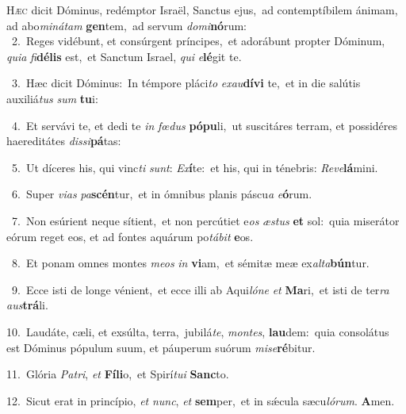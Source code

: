 \lettrine{\initial\textcolor{\initialcolor}{H}}{æc} dicit Dóminus, redémptor Israël, Sanctus ejus,~\dagger ad contemptíbilem ánimam, ad abo\-\textit{mi}\-\textit{ná}\textit{tam} \textbf{gen}\-tem,~\star ad servum \textit{do}\-\textit{mi}\textbf{nó}rum:\\
{\numbfont\textcolor{\numbcolor}{~2.}}~Reges vidébunt, et consúrgent príncipes,~\dagger et adorábunt propter Dóminum, \textit{qui}\-\textit{a} \textit{fi}\-\textbf{dé}\textbf{lis} est,~\star et Sanctum Israel, \textit{qui} \textit{e}\-\textbf{lé}git te.\par
{\numbfont\textcolor{\numbcolor}{~3.}}~Hæc dicit Dóminus:~\dagger In témpore pláci\textit{to} \textit{ex}\-\textit{au}\textbf{dí}\textbf{vi} te,~\star et in die salútis auxiliá\textit{tus} \textit{sum} \textbf{tu}\-i:\par
{\numbfont\textcolor{\numbcolor}{~4.}}~Et servávi te, et dedi te \textit{in} \textit{fœ}\-\textit{dus} \textbf{pó}\-\textbf{pu}li,~\star ut suscitáres terram, et possidéres haereditátes \textit{dis}\-\textit{si}\textbf{pá}tas:\par
{\numbfont\textcolor{\numbcolor}{~5.}}~Ut díceres his, qui vinc\textit{ti} \textit{sunt}\-: \textit{Ex}\-\textbf{í}te:~\star et his, qui in ténebris: \textit{Re}\-\textit{ve}\textbf{lá}mini.\par
{\numbfont\textcolor{\numbcolor}{~6.}}~Super \textit{vi}\-\textit{as} \textit{pa}\-\textbf{scén}tur,~\star et in ómnibus planis páscu\textit{a} \textit{e}\-\textbf{ó}rum.\par
{\numbfont\textcolor{\numbcolor}{~7.}}~Non esúrient neque sítient,~\dagger et non percútiet e\textit{os} \textit{æs}\-\textit{tus} \textbf{et} sol:~\star quia miserátor eórum reget eos, et ad fontes aquárum po\-\textit{tá}\-\textit{bit} \textbf{e}\-os.\par
{\numbfont\textcolor{\numbcolor}{~8.}}~Et ponam omnes montes \textit{me}\-\textit{os} \textit{in} \textbf{vi}\-am,~\star et sémitæ meæ ex\-\textit{al}\-\textit{ta}\textbf{bún}tur.\par
{\numbfont\textcolor{\numbcolor}{~9.}}~Ecce isti de longe vénient,~\dagger et ecce illi ab Aqui\-\textit{ló}\-\textit{ne} \textit{et} \textbf{Ma}\-ri,~\star et isti de ter\textit{ra} \textit{aus}\-\textbf{trá}li.\par
{\numbfont\textcolor{\numbcolor}{10.}}~Laudáte, cæli, et exsúlta, terra,~\dagger jubilá\-\textit{te}\-, \textit{mon}\-\textit{tes}, \textbf{lau}\-dem:~\star quia consolátus est Dóminus pópulum suum, et páuperum suórum \textit{mi}\-\textit{se}\textbf{ré}bitur.\par
{\numbfont\textcolor{\numbcolor}{11.}}~Glória \textit{Pa}\-\textit{tri}, \textit{et} \textbf{Fí}\-\textbf{li}o,~\star et Spirí\-\textit{tu}\-\textit{i} \textbf{Sanc}\-to.\par
{\numbfont\textcolor{\numbcolor}{12.}}~Sicut erat in princípio, \textit{et} \textit{nunc}\-, \textit{et} \textbf{sem}\-per,~\star et in sǽcula sæcu\-\textit{ló}\-\textit{rum}. \textbf{A}\-men.\par
